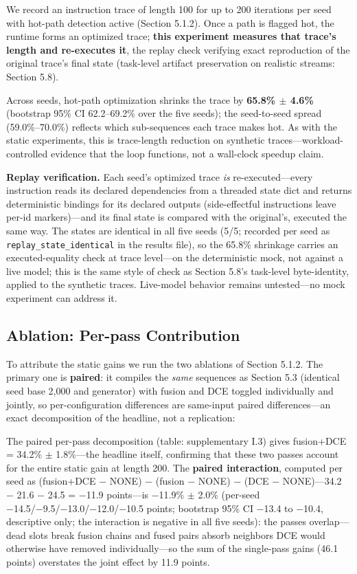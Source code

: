 \documentclass[
  sigconf,
  anonymous]{acmart}
\begin{document}
We record an instruction trace of length 100 for up to 200 iterations
per seed with hot-path detection active (Section 5.1.2). Once a path is
flagged hot, the runtime forms an optimized trace; \textbf{this
experiment measures that trace's length and re-executes it}, the replay
check verifying exact reproduction of the original trace's final state
(task-level artifact preservation on realistic streams: Section 5.8).

Across seeds, hot-path optimization shrinks the trace by \textbf{65.8\%
\(\pm\) 4.6\%} (bootstrap 95\% CI 62.2--69.2\% over the five seeds); the
seed-to-seed spread (59.0\%--70.0\%) reflects which sub-sequences each
trace makes hot. As with the static experiments, this is trace-length
reduction on synthetic traces---workload-controlled evidence that the
loop functions, not a wall-clock speedup claim.

\textbf{Replay verification.} Each seed's optimized trace \emph{is}
re-executed---every instruction reads its declared dependencies from a
threaded state dict and returns deterministic bindings for its declared
outputs (side-effectful instructions leave per-id markers)---and its
final state is compared with the original's, executed the same way. The
states are identical in all five seeds (5/5; recorded per seed as
\texttt{replay\_state\_identical} in the results file), so the 65.8\%
shrinkage carries an executed-equality check at trace level---on the
deterministic mock, not against a live model; this is the same style of
check as Section 5.8's task-level byte-identity, applied to the
synthetic traces. Live-model behavior remains untested---no mock
experiment can address it.

\subsection{Ablation: Per-pass
Contribution}\label{ablation-per-pass-contribution}

To attribute the static gains we run the two ablations of Section 5.1.2.
The primary one is \textbf{paired}: it compiles the \emph{same}
sequences as Section 5.3 (identical seed base 2,000 and generator) with
fusion and DCE toggled individually and jointly, so per-configuration
differences are same-input paired differences---an exact decomposition
of the headline, not a replication:

The paired per-pass decomposition (table: supplementary I.3) gives
fusion+DCE = 34.2\% \(\pm\) 1.8\%---the headline itself, confirming that
these two passes account for the entire static gain at length 200. The
\textbf{paired interaction}, computed per seed as (fusion+DCE − NONE) −
(fusion − NONE) − (DCE − NONE)---34.2 − 21.6 − 24.5 = −11.9 points---is
−11.9\% \(\pm\) 2.0\% (per-seed −14.5/−9.5/−13.0/−12.0/−10.5 points;
bootstrap 95\% CI −13.4 to −10.4, descriptive only; the interaction is
negative in all five seeds): the passes overlap---dead slots break
fusion chains and fused pairs absorb neighbors DCE would otherwise have
removed individually---so the sum of the single-pass gains (46.1 points)
overstates the joint effect by 11.9 points.
\end{document}
